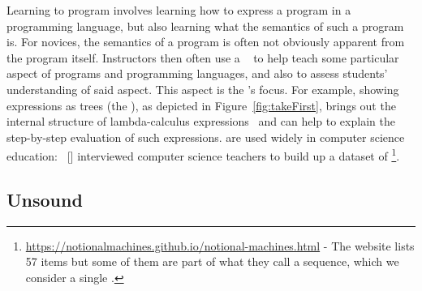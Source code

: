 Learning to program involves learning how to express a program in a programming language, 
but also learning what the semantics of such a program is. 
For novices, the semantics of a program is often not obviously apparent from the program itself.
Instructors then often use a \emph{\nm{}}~\citep{fincherNotionalMachinesComputing2020} to help teach
some particular aspect of programs and programming languages,
and also to assess students' understanding of said aspect.
%
This aspect is the \nm{}'s focus.
%
For example, showing expressions as trees (the  \nm{}),
as depicted in Figure~\ref{fig:takeFirst},
brings out the internal structure of lambda-calculus expressions~\citep{marceauValuesGrowTrees2011}
and can help to explain the step-by-step evaluation of such expressions. 
%
\Nms{} are used widely in computer science education:
\citeauthor{fincherNotionalMachinesComputing2020}~[\citeyear{fincherNotionalMachinesComputing2020}]
interviewed computer science teachers
to build up a dataset of \numOfNMs{} \nms{}%
\footnote{\url{https://notionalmachines.github.io/notional-machines.html} -
The website lists 57 items but some of them are part of what they call a \nm{} sequence,
which we consider a single \nm{}.}.


\subsection{Unsound \NMs{}}
\label{sec:UnsoundNotionalMachines}

